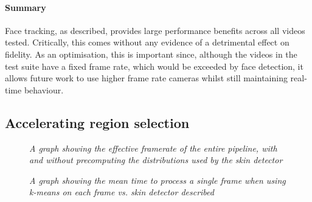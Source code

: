 

\paragraph{Summary}

Face tracking, as described, provides large performance benefits across all videos tested.
Critically, this comes without any evidence of a detrimental effect on fidelity. As an optimisation, this
is important since, although the videos in the test suite have a fixed frame rate, which would be exceeded by face detection, it allows future work to 
use higher frame rate cameras whilst still maintaining real-time behaviour. 

\subsection{Accelerating region selection}
\label{eval:region_selection}
\begin{figure}[H]
    \centering
    \scalebox{0.7}{}
   \caption{\textit{A graph showing the effective framerate of the entire pipeline, with and without precomputing the distributions used by the skin detector}} 
\end{figure}
\begin{figure}[H]
    \centering
    \scalebox{0.7}{}
   \caption{\textit{A graph showing the mean time to process a single frame when using k-means on each frame vs. skin detector described}} 
\end{figure}


